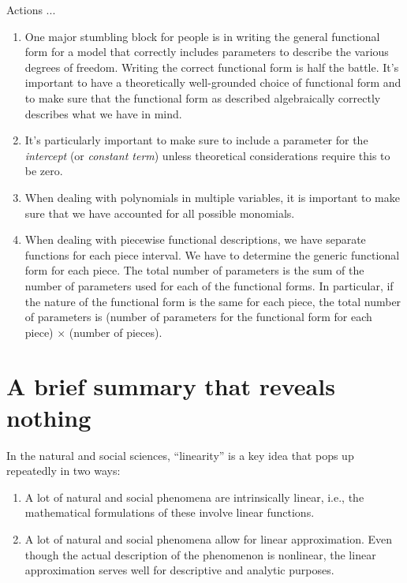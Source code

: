 \documentclass[10pt]{amsart}
\begin{document}
Actions ...

\begin{enumerate}
\item One major stumbling block for people is in writing the general
  functional form for a model that correctly includes parameters to
  describe the various degrees of freedom. Writing the correct
  functional form is half the battle. It's important to have a
  theoretically well-grounded choice of functional form and to make
  sure that the functional form as described algebraically correctly
  describes what we have in mind.
\item It's particularly important to make sure to include a parameter
  for the {\em intercept} (or {\em constant term}) unless theoretical
  considerations require this to be zero.
\item When dealing with polynomials in multiple variables, it is
  important to make sure that we have accounted for all possible monomials.
\item When dealing with piecewise functional descriptions, we have
  separate functions for each piece interval. We have to determine the
  generic functional form for each piece. The total number of
  parameters is the sum of the number of parameters used for each of
  the functional forms. In particular, if the nature of the functional
  form is the same for each piece, the total number of parameters is
  (number of parameters for the functional form for each piece)
  $\times$ (number of pieces).
\end{enumerate}

\section{A brief summary that reveals nothing}

In the natural and social sciences, ``linearity'' is a key idea that
pops up repeatedly in two ways:

\begin{enumerate}
\item A lot of natural and social phenomena are intrinsically linear,
  i.e., the mathematical formulations of these involve linear
  functions.

\item A lot of natural and social phenomena allow for linear
  approximation. Even though the actual description of the phenomenon
  is nonlinear, the linear approximation serves well for descriptive
  and analytic purposes.
\end{enumerate}
\end{document}
